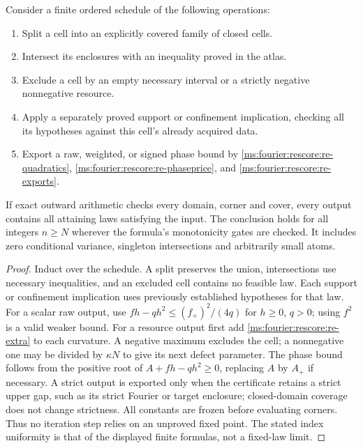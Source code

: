 \begin{theorem}\label{ms:fourier:rescore:re-enclosure}
Consider a finite ordered schedule of the following operations:
\begin{enumerate}
\item Split a cell into an explicitly covered family of closed cells.
\item Intersect its enclosures with an inequality proved in the atlas.
\item Exclude a cell by an empty necessary interval or a strictly
negative nonnegative resource.
\item Apply a separately proved support or confinement implication,
checking all its hypotheses against this cell's already acquired data.
\item Export a raw, weighted, or signed phase bound by
\eqref{ms:fourier:rescore:re-quadratics}, \eqref{ms:fourier:rescore:re-phaseprice}, and \eqref{ms:fourier:rescore:re-exports}.
\end{enumerate}
If exact outward arithmetic checks every domain, corner and cover,
every output contains all attaining laws satisfying the input. The
conclusion holds for all integers $n\ge N$ wherever the formula's
monotonicity gates are checked. It includes zero conditional variance,
singleton intersections and arbitrarily small atoms.
\end{theorem}
\begin{proof}
Induct over the schedule. A split preserves the union, intersections use
necessary inequalities, and an excluded cell contains no feasible law.
Each support or confinement implication uses previously established hypotheses for that law.
For a scalar raw output, use
$fh-qh^2\le(f_+)^2/(4q)$ for $h\ge0$, $q>0$; using $f^2$ is a valid
weaker bound. For a resource output first add \eqref{ms:fourier:rescore:re-extra} to each
curvature. A negative maximum excludes the cell; a nonnegative one may
be divided by $\kappa N$ to give its next defect parameter.
The phase bound follows from the positive root of
$A+fh-qh^2\ge0$, replacing $A$ by $A_+$ if necessary.
A strict output is exported only when the certificate retains a strict
upper gap, such as its strict Fourier or target enclosure; closed-domain
coverage does not change strictness. All constants are frozen before evaluating
corners. Thus no iteration
step relies on an unproved fixed point. The stated index uniformity is
that of the displayed finite formulas, not a fixed-law limit.
\end{proof}

